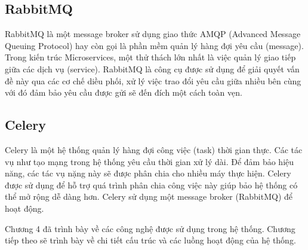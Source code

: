 \documentclass[../DoAn.tex]{subfiles}
\begin{document}
\subsection{RabbitMQ}

RabbitMQ\cite{rabbitmq} là một message broker sử dụng giao thức AMQP (Advanced Message Queuing
Protocol) hay còn gọi là phần mềm quản lý hàng đợi yêu cầu (message). Trong
kiến trúc Mỉcroservices, một thử thách lớn nhất là việc quản lý giao tiếp giữa
các dịch vụ (service). RabbitMQ là công cụ được sử dụng để giải quyết vấn đề
này qua các cơ chế diều phối, xử lý việc trao đổi yêu cầu giữa nhiều bên cùng
với đó đảm bảo yêu cầu được gửi sẽ đến đích một cách toàn vẹn.

\subsection{Celery}

Celery\cite{celery} là một hệ thống quản lý hàng đợi công việc (task) thời gian thực. Các
tác vụ như tạo mạng trong hệ thống yêu cầu thời gian xử lý dài. Để đảm bảo hiệu
năng, các tác vụ nặng này sẽ được phân chia cho nhiều máy thực hiện. Celery
được sử dụng để hỗ trợ quá trình phân chia công việc này giúp bảo hệ thống có
thể mở rộng dễ dàng hơn. Celery sử dụng một message broker (RabbitMQ) để hoạt
động.

Chương 4 đã trình bày về các công nghệ được sử dụng trong hệ thống. Chương tiếp
theo sẽ trình bày về chi tiết cấu trúc và các luồng hoạt động của hệ thống.





\end{document}
